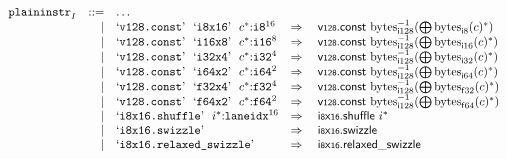 $$
\begin{array}[t]{@{}lrrl@{}l@{}l@{}l@{}}
& {{\mathtt{plaininstr}}}_{I} & ::= & \dots \\
& & | & \mbox{‘\texttt{v128.const}’}~~\mbox{‘\texttt{i8x16}’}~~{c^\ast}{:}{{\mathtt{i8}}^{16}} & \quad\Rightarrow\quad{} & \mathsf{v{\scriptstyle 128}}{.}\mathsf{const}~{{{{\mathrm{bytes}}}_{{\mathsf{i}}{128}}^{{-1}}}}{({\bigoplus}\, {{{\mathrm{bytes}}}_{{\mathsf{i}}{8}}(c)^\ast})} \\
& & | & \mbox{‘\texttt{v128.const}’}~~\mbox{‘\texttt{i16x8}’}~~{c^\ast}{:}{{\mathtt{i16}}^{8}} & \quad\Rightarrow\quad{} & \mathsf{v{\scriptstyle 128}}{.}\mathsf{const}~{{{{\mathrm{bytes}}}_{{\mathsf{i}}{128}}^{{-1}}}}{({\bigoplus}\, {{{\mathrm{bytes}}}_{{\mathsf{i}}{16}}(c)^\ast})} \\
& & | & \mbox{‘\texttt{v128.const}’}~~\mbox{‘\texttt{i32x4}’}~~{c^\ast}{:}{{\mathtt{i32}}^{4}} & \quad\Rightarrow\quad{} & \mathsf{v{\scriptstyle 128}}{.}\mathsf{const}~{{{{\mathrm{bytes}}}_{{\mathsf{i}}{128}}^{{-1}}}}{({\bigoplus}\, {{{\mathrm{bytes}}}_{{\mathsf{i}}{32}}(c)^\ast})} \\
& & | & \mbox{‘\texttt{v128.const}’}~~\mbox{‘\texttt{i64x2}’}~~{c^\ast}{:}{{\mathtt{i64}}^{2}} & \quad\Rightarrow\quad{} & \mathsf{v{\scriptstyle 128}}{.}\mathsf{const}~{{{{\mathrm{bytes}}}_{{\mathsf{i}}{128}}^{{-1}}}}{({\bigoplus}\, {{{\mathrm{bytes}}}_{{\mathsf{i}}{64}}(c)^\ast})} \\
& & | & \mbox{‘\texttt{v128.const}’}~~\mbox{‘\texttt{f32x4}’}~~{c^\ast}{:}{{\mathtt{f32}}^{4}} & \quad\Rightarrow\quad{} & \mathsf{v{\scriptstyle 128}}{.}\mathsf{const}~{{{{\mathrm{bytes}}}_{{\mathsf{i}}{128}}^{{-1}}}}{({\bigoplus}\, {{{\mathrm{bytes}}}_{{\mathsf{f}}{32}}(c)^\ast})} \\
& & | & \mbox{‘\texttt{v128.const}’}~~\mbox{‘\texttt{f64x2}’}~~{c^\ast}{:}{{\mathtt{f64}}^{2}} & \quad\Rightarrow\quad{} & \mathsf{v{\scriptstyle 128}}{.}\mathsf{const}~{{{{\mathrm{bytes}}}_{{\mathsf{i}}{128}}^{{-1}}}}{({\bigoplus}\, {{{\mathrm{bytes}}}_{{\mathsf{f}}{64}}(c)^\ast})} \\
& & | & \mbox{‘\texttt{i8x16.shuffle}’}~~{i^\ast}{:}{{\mathtt{laneidx}}^{16}} & \quad\Rightarrow\quad{} & {\mathsf{i{\scriptstyle 8}}}{\mathsf{x}}{\mathsf{{\scriptstyle 16}}}{.}\mathsf{shuffle}~{i^\ast} \\
& & | & \mbox{‘\texttt{i8x16.swizzle}’} & \quad\Rightarrow\quad{} & {\mathsf{i{\scriptstyle 8}}}{\mathsf{x}}{\mathsf{{\scriptstyle 16}}} {.} \mathsf{swizzle} \\
& & | & \mbox{‘\texttt{i8x16.relaxed\_swizzle}’} & \quad\Rightarrow\quad{} & {\mathsf{i{\scriptstyle 8}}}{\mathsf{x}}{\mathsf{{\scriptstyle 16}}} {.} \mathsf{relaxed\_swizzle} \\

\end{array}$$
